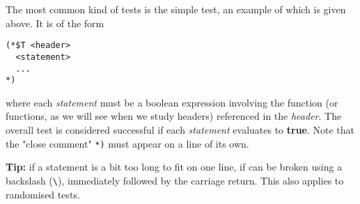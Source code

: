 
The most common kind of tests is the simple test, an example of which is given above. It
is of the form

\begin{verbatim}
(*$T <header>
  <statement>
  ...
*)
\end{verbatim}

where each \emph{statement} must be a boolean \OCaml{} expression involving the function (or
functions, as we will see when we study headers) referenced in the \emph{header}.
The overall test is considered successful if each \emph{statement} evaluates to \textbf{true}. Note
that the "close comment" \texttt{*)} must appear on a line of its own.

\textbf{Tip:} if a statement is a bit too long to fit on one line, if can be broken using a
backslash (\texttt{\backslash}), immediately followed by the carriage return. This also applies to
randomised tests.